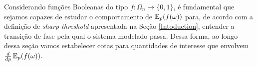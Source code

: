 Considerando funções Booleanas do tipo $f: \Omega_n \longrightarrow \{0, 1\}$, é fundamental que sejamos capazes de estudar o comportamento de $\operatorname{\mathbb{E}}_p(f(\omega))$ para, de acordo com a definição de \textit{sharp threshold} apresentada na Seção \ref{Intoduction}, entender a transição de fase pela qual o sistema modelado passa. Dessa forma, ao longo dessa seção vamos estabelecer cotas para quantidades de interesse que envolvem $\frac{d}{dp}\operatorname{\mathbb{E}}_p(f(\omega))$.


